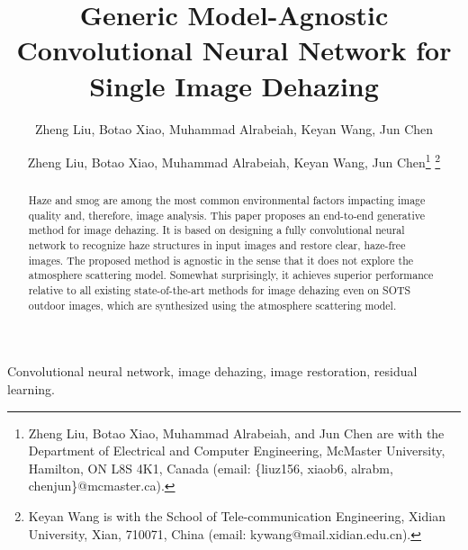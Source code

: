 \documentclass[journal]{IEEEtran}
\begin{document}
\title{Generic Model-Agnostic Convolutional Neural Network for Single Image Dehazing}

\author{Zheng Liu,
		Botao Xiao,
		Muhammad Alrabeiah,
		Keyan Wang,
        Jun Chen
}

\author{Zheng Liu, Botao Xiao, Muhammad Alrabeiah, Keyan Wang, Jun Chen\thanks{ Zheng Liu, Botao Xiao, Muhammad Alrabeiah, and Jun Chen are with the Department of Electrical and Computer Engineering, McMaster University, Hamilton, ON L8S 4K1, Canada (email: \{liuz156, xiaob6, alrabm, chenjun\}@mcmaster.ca).} \thanks{Keyan Wang is with the School of Tele-communication Engineering, Xidian University, Xian, 710071, China (email: kywang@mail.xidian.edu.cn).}}














\maketitle

\begin{abstract}
Haze and smog are among the most common environmental factors impacting image quality and, therefore, image analysis. This paper proposes an end-to-end generative method for image dehazing. It is based on designing a fully convolutional neural network to recognize haze structures in input images and restore clear, haze-free images. The proposed method is agnostic in the sense that it does not explore the atmosphere scattering model. Somewhat surprisingly, it achieves superior performance relative to all existing state-of-the-art methods for image dehazing even on SOTS outdoor images, which are synthesized using the atmosphere scattering model.
\end{abstract}

\begin{IEEEkeywords}
Convolutional neural network, image dehazing, image restoration,  residual learning.
\end{IEEEkeywords}






\IEEEpeerreviewmaketitle
\end{document}
